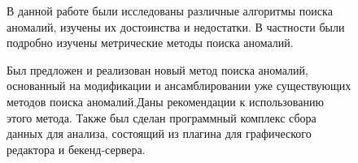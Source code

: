 \Conclusion %

\begin{figure}
В данной работе были исследованы различные алгоритмы поиска аномалий, изучены их достоинства и недостатки. В частности были подробно изучены метрические методы поиска аномалий.

Был предложен и реализован новый метод поиска аномалий, основанный на модификации и ансамблировании уже существующих методов поиска аномалий.Даны рекомендации к использованию этого метода. Также был сделан программный комплекс сбора данных для анализа, состоящий из плагина для графического редактора и бекенд-сервера.
\end{figure}
